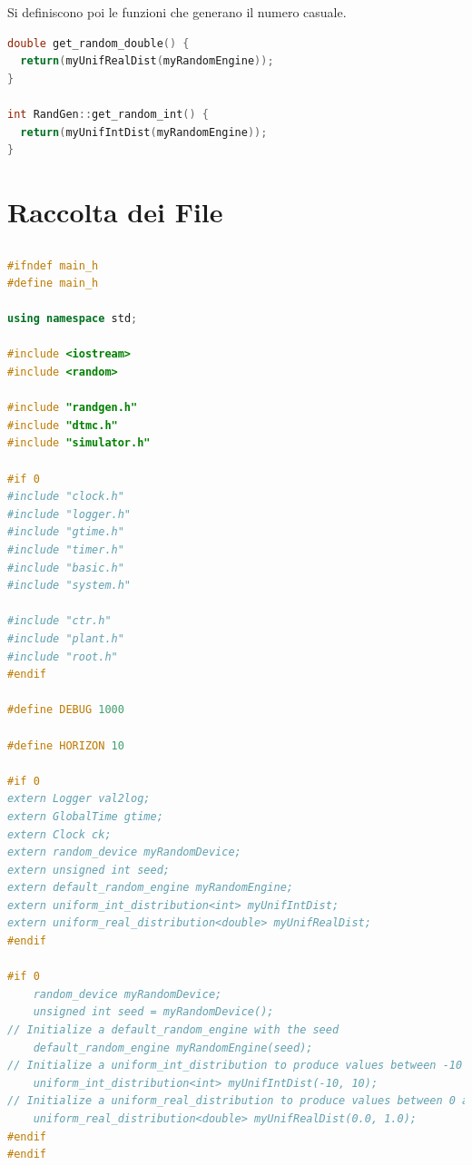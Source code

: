 \documentclass[10pt, letterpaper]{report}
\begin{document}
Si definiscono poi le funzioni che generano il numero casuale.
\begin{lstlisting}[style=CppStyle,language=C++]
double get_random_double() {
  return(myUnifRealDist(myRandomEngine));
} 

int RandGen::get_random_int() {
  return(myUnifIntDist(myRandomEngine));
} 
\end{lstlisting}


\newpage 
\section{Raccolta dei File}
\subsection{}
\begin{lstlisting}[style=CppStyle,language=C++]
#ifndef main_h
#define main_h
    
using namespace std;
    
#include <iostream>
#include <random>
    
#include "randgen.h"
#include "dtmc.h"
#include "simulator.h"
    
#if 0
#include "clock.h"
#include "logger.h"
#include "gtime.h"
#include "timer.h"
#include "basic.h"
#include "system.h"
    
#include "ctr.h"
#include "plant.h"
#include "root.h"
#endif
     
#define DEBUG 1000
    
#define HORIZON 10
    
#if 0
extern Logger val2log;
extern GlobalTime gtime;
extern Clock ck;
extern random_device myRandomDevice;
extern unsigned int seed;
extern default_random_engine myRandomEngine;
extern uniform_int_distribution<int> myUnifIntDist;
extern uniform_real_distribution<double> myUnifRealDist;
#endif
    
#if 0
    random_device myRandomDevice;
    unsigned int seed = myRandomDevice();  
// Initialize a default_random_engine with the seed
    default_random_engine myRandomEngine(seed);
// Initialize a uniform_int_distribution to produce values between -10 and 10
    uniform_int_distribution<int> myUnifIntDist(-10, 10);
// Initialize a uniform_real_distribution to produce values between 0 and 1
    uniform_real_distribution<double> myUnifRealDist(0.0, 1.0);
#endif 
#endif
\end{lstlisting}
\end{document}
